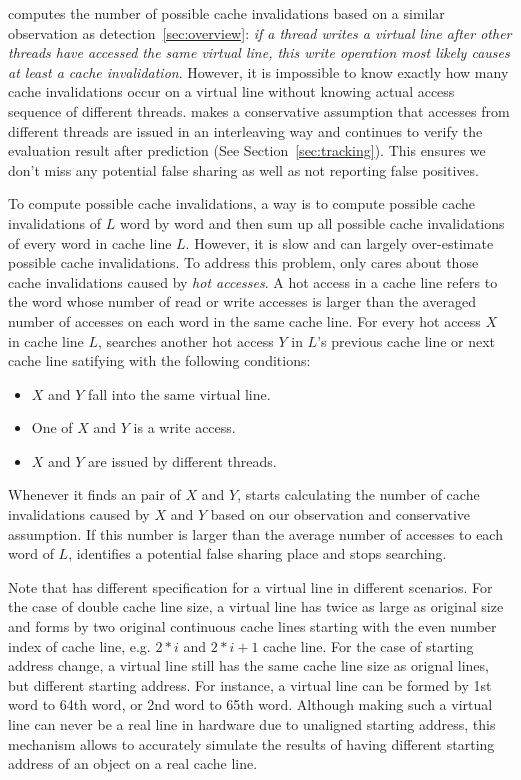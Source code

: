  computes the number of possible cache invalidations based on a 
similar observation as detection~\ref{sec:overview}: 
{\it if a thread writes a virtual line after other threads 
have accessed the same virtual line, this write operation most likely causes at least a cache 
invalidation}. 
However, it is impossible to know exactly how many cache invalidations occur on a virtual
line without knowing actual access sequence of different threads.  
 makes a conservative assumption that 
accesses from different threads are issued in an interleaving way and
continues to verify the evaluation result after prediction (See Section~\ref{sec:tracking}).
This ensures we don't miss any potential false sharing as well as 
not reporting false positives.

To compute possible cache invalidations, a way is to compute possible 
cache invalidations of $L$ word by word and then sum up all possible cache invalidations 
of every word in cache line $L$. 
However, it is slow and can largely over-estimate possible cache invalidations.
To address this problem,  only cares about those cache invalidations caused by
{\it hot accesses}. A hot access in a cache line refers to the word whose number of read or write accesses 
is larger than the averaged number of accesses on each word in the same cache
line.
For every hot access $X$ in cache line $L$,  searches another
hot access $Y$ in $L$'s previous cache line or next cache line satifying with
the following conditions: 

\begin{itemize}
\item
$X$ and $Y$ fall into the same virtual line. 

\item
One of $X$ and $Y$ is a write access.

\item 
$X$ and $Y$ are issued by different threads.

\end{itemize}

Whenever it finds an pair of $X$ and $Y$, 
 starts calculating the number of cache invalidations caused by $X$ and $Y$
based on our observation and conservative assumption.
If this number is larger than the average number of accesses to each word of $L$, 
 identifies a potential false sharing place and stops searching.

Note that  has different specification for a virtual line in
different scenarios. 
For the case of double cache line size, a virtual line has twice
 as large as original size and forms by two original 
continuous cache lines starting with the even number index of cache line, 
e.g. $2*i$ and $2*i+1$ cache line.
For the case of starting address change,
a virtual line still has the same cache line size as orignal lines, but
different starting address.
For instance, a virtual line can be formed by 1st word to 64th word, or 2nd word to 65th word.
Although making such a virtual line can never be a real line in hardware due to unaligned starting
address, this mechanism allows to accurately simulate the results of having different starting address of an
object on a real cache line.


